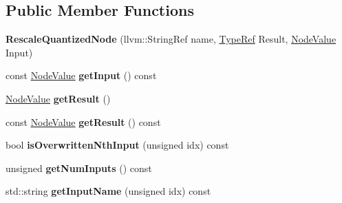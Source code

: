 \subsection*{Public Member Functions}
\begin{DoxyCompactItemize}
\item 
\mbox{\label{classglow_1_1_rescale_quantized_node_aee9823f635973f94d69bf51ac5ee3a7d}} 
{\bfseries Rescale\+Quantized\+Node} (llvm\+::\+String\+Ref name, \hyperlink{structglow_1_1_type}{Type\+Ref} Result, \hyperlink{structglow_1_1_node_value}{Node\+Value} Input)
\item 
\mbox{\label{classglow_1_1_rescale_quantized_node_ad00b5942167cec60a5e4cf9bb630bb43}} 
const \hyperlink{structglow_1_1_node_value}{Node\+Value} {\bfseries get\+Input} () const
\item 
\mbox{\label{classglow_1_1_rescale_quantized_node_aa1ecba6daccef59ace13f1bc357723be}} 
\hyperlink{structglow_1_1_node_value}{Node\+Value} {\bfseries get\+Result} ()
\item 
\mbox{\label{classglow_1_1_rescale_quantized_node_a9b1be3dd50c3de80f73e9d3b99dc97bb}} 
const \hyperlink{structglow_1_1_node_value}{Node\+Value} {\bfseries get\+Result} () const
\item 
\mbox{\label{classglow_1_1_rescale_quantized_node_ab9a418fa37c6ca1796383239f1135e72}} 
bool {\bfseries is\+Overwritten\+Nth\+Input} (unsigned idx) const
\item 
\mbox{\label{classglow_1_1_rescale_quantized_node_af33fdfc400b661e7631017b4f1889847}} 
unsigned {\bfseries get\+Num\+Inputs} () const
\item 
\mbox{\label{classglow_1_1_rescale_quantized_node_acf0cb40c35632da18c6935d5bc0f6b96}} 
std\+::string {\bfseries get\+Input\+Name} (unsigned idx) const
\item 
\mbox{\label{classglow_1_1_rescale_quantized_node_a9917c2391aaa594279e5b9e5c2e2a456}} 

\end{DoxyCompactItemize}
